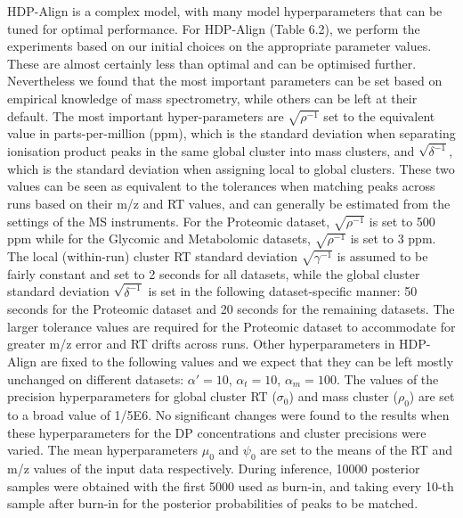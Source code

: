 \documentclass[11pt,a4paper]{article}
\begin{document}
\begin{itemize}
\begin{itemize}
{\begin{minipage}{37em}
		HDP-Align is a complex model, with many model hyperparameters that can be tuned for optimal performance. For HDP-Align (Table 6.2), we perform the experiments based on our initial choices on the appropriate parameter values. These are almost certainly less than optimal and can be optimised further. Nevertheless we found that the most important parameters can be set based on empirical knowledge of mass spectrometry, while others can be left at their default. The most important hyper-parameters are $\sqrt{\rho^{-1}}$ set to the equivalent value in parts-per-million (ppm), which is the standard deviation when separating ionisation product peaks in the same global cluster into mass clusters, and $\sqrt{\delta^{-1}}$, which is the standard deviation when assigning local to global clusters. These two values can be seen as equivalent to the tolerances when matching peaks across runs based on their m/z and RT values, and can generally be estimated from the settings of the MS instruments. For the Proteomic dataset, $\sqrt{\rho^{-1}}$ is set to 500 ppm while for the Glycomic and Metabolomic datasets, $\sqrt{\rho^{-1}}$ is set to 3 ppm. The local (within-run) cluster RT standard deviation $\sqrt{\gamma^{-1}}$ is assumed to be fairly constant and set to 2 seconds for all datasets, while the global cluster standard deviation $\sqrt{\delta^{-1}}$ is set in the following dataset-specific manner: 50 seconds for the Proteomic dataset and 20 seconds for the remaining datasets. The larger tolerance values are required for the Proteomic dataset to accommodate for greater m/z error and RT drifts across runs. 
		\newline
		\newline
		Other hyperparameters in HDP-Align are fixed to the following values and we expect that they can be left mostly unchanged on different datasets: $\alpha'=10$, $\alpha_t=10$, $\alpha_m=100$. The values of the precision hyperparameters for global cluster RT ($\sigma_0$) and mass cluster ($\rho_0$) are set to a broad value of 1/5E6. No significant changes were found to the results when these hyperparameters for the DP concentrations and cluster precisions were varied. The mean hyperparameters $\mu_0$ and $\psi_0$ are set to the means of the RT and m/z values of the input data respectively. During inference, 10000 posterior samples were obtained with the first 5000 used as burn-in, and taking every 10-th sample after burn-in for the posterior probabilities of peaks to be matched.
		\end{minipage}}			
		\newline		     	

\end{itemize}
\end{itemize}
\end{document}
